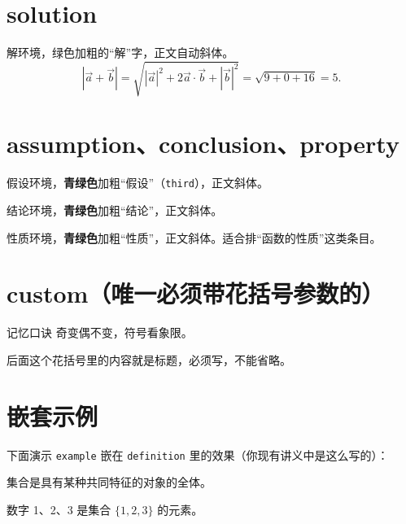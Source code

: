 \documentclass[lang=cn,newtx,10pt,scheme=chinese,nofont]{elegantbook}
\begin{document}
\section{solution}

\begin{solution}
解环境，绿色加粗的“解”字，正文自动斜体。
\[
|\vec{a}+\vec{b}|=\sqrt{|\vec{a}|^2+2\vec{a}\cdot\vec{b}+|\vec{b}|^2}=\sqrt{9+0+16}=5.
\]
\end{solution}

\section{assumption、conclusion、property}

\begin{assumption}
假设环境，\textbf{青绿色}加粗“假设”（\texttt{third}），正文斜体。
\end{assumption}

\begin{conclusion}
结论环境，\textbf{青绿色}加粗“结论”，正文斜体。
\end{conclusion}

\begin{property}
性质环境，\textbf{青绿色}加粗“性质”，正文斜体。适合排“函数的性质”这类条目。
\end{property}

\section{custom（唯一必须带花括号参数的）}

\begin{custom}{记忆口诀}
奇变偶不变，符号看象限。
\end{custom}

后面这个花括号里的内容就是标题，必须写，不能省略。

\section{嵌套示例}

下面演示 \texttt{example} 嵌在 \texttt{definition} 里的效果（你现有讲义中是这么写的）：

\begin{definition}[集合]
集合是具有某种共同特征的对象的全体。
\begin{example}
数字 1、2、3 是集合 $\{1,2,3\}$ 的元素。
\end{example}
\end{definition}
\end{document}
